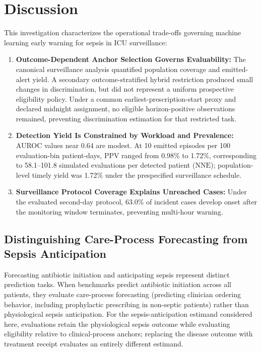 \documentclass[10pt,twocolumn,a4paper]{article}
\begin{document}
\section{Discussion}
This investigation characterizes the operational trade-offs governing machine learning early warning for sepsis in ICU surveillance:
\begin{enumerate}
    \setlength{\itemsep}{0pt}
    \setlength{\parsep}{0pt}
    \setlength{\parskip}{0pt}
    \item \textbf{Outcome-Dependent Anchor Selection Governs Evaluability:} The canonical surveillance analysis quantified population coverage and emitted-alert yield. A secondary outcome-stratified hybrid restriction produced small changes in discrimination, but did not represent a uniform prospective eligibility policy. Under a common earliest-prescription-start proxy and declared midnight assignment, no eligible horizon-positive observations remained, preventing discrimination estimation for that restricted task.
    \item \textbf{Detection Yield Is Constrained by Workload and Prevalence:} AUROC values near 0.64 are modest. At 10 emitted episodes per 100 evaluation-bin patient-days, PPV ranged from 0.98\% to 1.72\%, corresponding to 58.1--101.8 simulated evaluations per detected patient ($\text{NNE}$); population-level timely yield was 1.72\% under the prespecified surveillance schedule.
    \item \textbf{Surveillance Protocol Coverage Explains Unreached Cases:} Under the evaluated second-day protocol, 63.0\% of incident cases develop onset after the monitoring window terminates, preventing multi-hour warning.
\end{enumerate}

\subsection{Distinguishing Care-Process Forecasting from Sepsis Anticipation}
Forecasting antibiotic initiation and anticipating sepsis represent distinct prediction tasks. When benchmarks predict antibiotic initiation across all patients, they evaluate care-process forecasting (predicting clinician ordering behavior, including prophylactic prescribing in non-septic patients) rather than physiological sepsis anticipation. For the sepsis-anticipation estimand considered here, evaluations retain the physiological sepsis outcome while evaluating eligibility relative to clinical-process anchors; replacing the disease outcome with treatment receipt evaluates an entirely different estimand.
\end{document}
